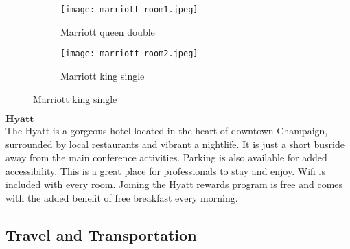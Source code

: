\begin{figure}[H]
	\centering
	\begin{subfigure}[b]{0.5\linewidth}
		\centering
		\texttt{[image: marriott\_room1.jpeg]}
		\caption{Marriott queen double}
	\end{subfigure}
	\begin{subfigure}[b]{0.5\textwidth}
		\centering
		\texttt{[image: marriott\_room2.jpeg]}
		\caption{Marriott king single}
	\end{subfigure}
\end{figure}

$\textbf{Hyatt}$\\
The Hyatt is a gorgeous hotel located in the heart of downtown Champaign, surrounded by local restaurants and vibrant a nightlife. It is just a short busride away from the main conference activities. Parking is also available for added accessibility. This is a great place for professionals to stay and enjoy. Wifi is included with every room. Joining the Hyatt rewards program is free and comes with the added benefit of free breakfast every morning. 

\newpage
\subsection{Travel and Transportation}

